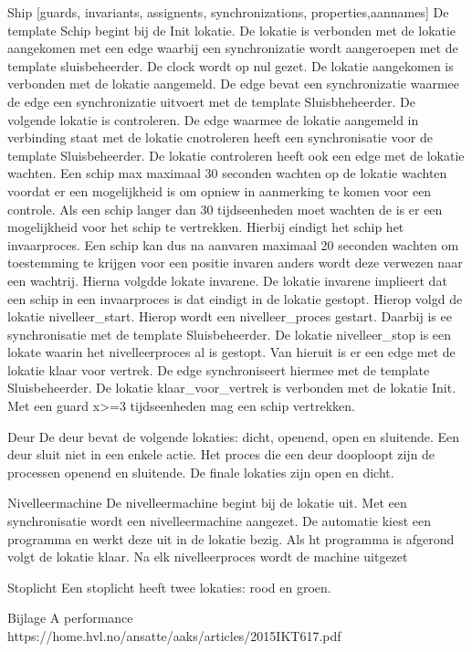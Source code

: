 Ship [guards, invariants, assignents, synchronizations, properties,aannames]
De template Schip begint bij de Init lokatie. De lokatie is verbonden met de lokatie aangekomen met een edge waarbij een synchronizatie wordt aangeroepen met de template sluisbeheerder. De clock wordt op nul gezet. De lokatie aangekomen is verbonden met de lokatie aangemeld. De edge bevat een synchronizatie waarmee de edge een synchronizatie uitvoert met de template Sluisbheheerder.
De volgende lokatie is  controleren. De edge waarmee de lokatie aangemeld in verbinding staat met de lokatie cnotroleren heeft een synchronisatie voor de template Sluisbeheerder. De lokatie controleren heeft ook een edge met de lokatie wachten. Een schip max maximaal 30 seconden wachten op de lokatie wachten voordat er een mogelijkheid is om opniew in aanmerking te komen voor een controle. Als een schip langer dan 30 tijdseenheden moet wachten de is er een mogelijkheid voor het schip te vertrekken. Hierbij eindigt het schip het invaarproces. Een schip kan dus na aanvaren maximaal 20 seconden wachten om toestemming te krijgen voor een positie invaren anders wordt deze verwezen naar een wachtrij.
Hierna volgdde lokate invarene. De lokatie invarene implieert dat een schip in een invaarproces is dat eindigt in de lokatie gestopt.
Hierop volgd de lokatie nivelleer_start. Hierop wordt een nivelleer_proces gestart. Daarbij is ee synchronisatie met de template Sluisbeheerder.
De lokatie nivelleer_stop is een lokate waarin het nivelleerproces al is gestopt. Van hieruit is er een edge met de lokatie klaar voor vertrek. De edge synchroniseert hiermee met de template Sluisbeheerder.
De lokatie klaar_voor_vertrek is verbonden met de lokatie Init. Met een guard x>=3 tijdseenheden mag een schip vertrekken.


Deur
De deur bevat de volgende lokaties: dicht, openend, open en sluitende.
Een deur sluit niet in een enkele actie. Het proces die een deur dooploopt zijn de processen openend en sluitende. De finale lokaties zijn open en dicht.

Nivelleermachine
De nivelleermachine begint bij de lokatie uit. Met een synchronisatie wordt een nivelleermachine aangezet. De automatie kiest een programma en werkt deze uit in de lokatie bezig. Als ht programma is afgerond volgt de lokatie klaar. Na elk nivelleerproces wordt de machine uitgezet

Stoplicht
Een stoplicht heeft twee lokaties: rood en groen.



Bijlage A performance
https://home.hvl.no/ansatte/aaks/articles/2015IKT617.pdf

